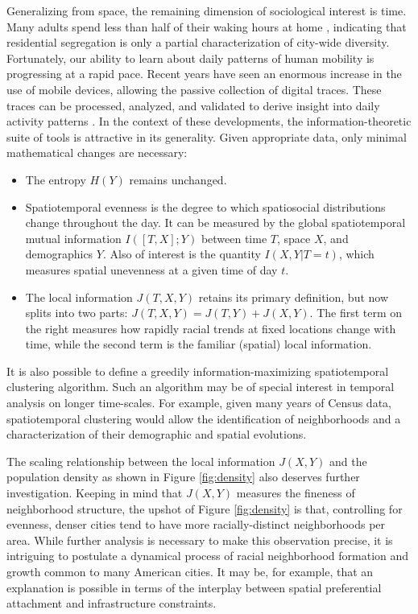 Generalizing from space, the remaining dimension of sociological interest is time. Many adults spend less than half of their waking hours at home \cite{employment_stats}, indicating that residential segregation is only a partial characterization of city-wide diversity. Fortunately, our ability to learn about daily patterns of human mobility is progressing at a rapid pace. Recent years have seen an enormous increase in the use of mobile devices, allowing the passive collection of digital traces. These traces can be processed, analyzed, and validated to derive insight into daily activity patterns \cite{Widhalm2015,Yang,Jiang2013,Jiang2012c}. In the context of these developments, the information-theoretic suite of tools is attractive in its generality. Given appropriate data, only minimal mathematical changes are necessary: 
\begin{itemize} 
	\item The entropy $H(Y)$ remains unchanged. 
	\item Spatiotemporal evenness is the degree to which spatiosocial distributions change throughout the day. It can be measured by the global spatiotemporal mutual information $I([T,X];Y)$ between time $T$, space $X$, and demographics $Y$. Also of interest is the quantity $I(X,Y|T=t)$, which measures spatial unevenness at a given time of day $t$. 
	\item The local information $J(T,X,Y)$ retains its primary definition, but now splits into two parts:  $J(T,X,Y) = J(T,Y) + J(X,Y)$. The first term on the right measures how rapidly racial trends at fixed locations change with time, while the second term is the familiar (spatial) local information. 
\end{itemize}
It is also possible to define a greedily information-maximizing spatiotemporal clustering algorithm. Such an algorithm may be of special interest in temporal analysis on longer time-scales. For example, given many years of Census data, spatiotemporal clustering would allow the identification of neighborhoods and a characterization of their demographic and spatial evolutions. 

The scaling relationship between the local information $J(X,Y)$ and the population density as shown in Figure \ref{fig:density} also deserves further investigation. Keeping in mind that $J(X,Y)$ measures the fineness of neighborhood structure, the upshot of Figure \ref{fig:density} is that, controlling for evenness, denser cities tend to have more racially-distinct neighborhoods per area. While further analysis is necessary to make this observation precise, it is intriguing to postulate a dynamical process of racial neighborhood formation and growth common to many American cities. It may be, for example, that an explanation is possible in terms of the interplay between spatial preferential attachment and infrastructure constraints. 